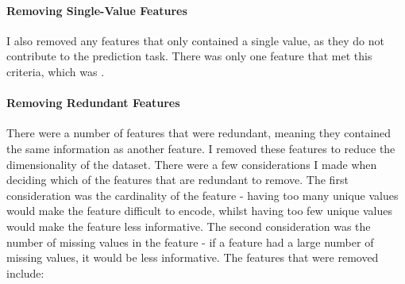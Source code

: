 \documentclass{article}
\begin{document}
\paragraph{Removing Single-Value Features}
I also removed any features that only contained a single value, as they do not contribute to the prediction task. There was only one feature that met this criteria, which was .

\paragraph{Removing Redundant Features}
There were a number of features that were redundant, meaning they contained the same information as another feature. I removed these features to reduce the dimensionality of the dataset. There were a few considerations I made when deciding which of the features that are redundant to remove. The first consideration was the cardinality of the feature - having too many unique values would make the feature difficult to encode, whilst having too few unique values would make the feature less informative. The second consideration was the number of missing values in the feature - if a feature had a large number of missing values, it would be less informative. The features that were removed include:
\end{document}
